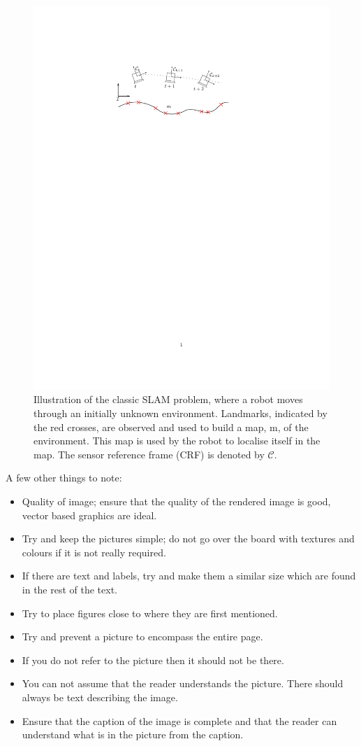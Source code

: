 \documentclass[12pt]{article}
\begin{document}
\begin{figure}
	\centering
	\includegraphics[width=0.7\linewidth]{figures/CameraSLAM2_comp}
	\caption{Illustration of the classic SLAM problem, where a robot moves through an initially unknown environment. Landmarks, indicated by the red crosses, are observed and used to build a map, m, of the environment. This map is used by the robot to localise itself in the map. The sensor reference frame (CRF) is denoted by $\mathcal{C}$.}
	\label{fig:cameraslam2comp}
\end{figure}

A few other things to note:
\begin{itemize}
	\item Quality of image; ensure that the quality of the rendered image is good, vector based graphics are ideal.
	\item Try and keep the pictures simple; do not go over the board with textures and colours if it is not really required.
	\item If there are text and labels, try and make them a similar size which are found in the rest of the text.
	\item Try to place figures close to where they are first mentioned.
	\item Try and prevent a picture to encompass the entire page.
	\item If you do not refer to the picture then it should not be there.
	\item You can not assume that the reader understands the picture.
	There should always be text describing the image.
	\item Ensure that the caption of the image is complete and that the reader can understand what is in the picture from the caption.
\end{itemize}
\end{document}
